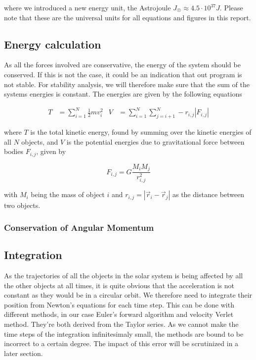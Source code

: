 \documentclass[10pt]{article}
\begin{document}
\begin{multicols}{2}
where we introduced a new energy unit, the Astrojoule $J_\Sun \approx 4.5\cdot10^{37}J  $.  Please note
that these are the universal units for all equations and figures in this
report.


\subsection{Energy calculation}
As all the forces involved are conservative, the energy of the system
should be conserved. If this is not the case, it could be an indication
that out program is not stable. For stability analysis, we will therefore
make sure that the sum of the systems energies is constant. The energies
are given by the following equations 

\begin{align}\label{eq:energies}
    T &= \sum_{i=1}^N \frac{1}{2}mv_i^2 & V &= \sum_{i=1}^N \sum_{j=i+1}^N
    -r_{i,j}|F_{i,j}|
\end{align}

where $T$ is the total kinetic energy, found by summing over the kinetic
energies of all $N$ objects, and $V$ is the potential energies due to
gravitational force between bodies $F_{i,j}$, given by

\begin{equation}
    F_{i,j} =  G\frac{M_iM_j}{r_{i,j}^2}
\end{equation}

with $M_i$ being the mass of object $i$ and $r_{i,j} = |\vec r_i - \vec
r_j|$ as the distance between two objects.

\subsubsection{Conservation of Angular Momentum}



\subsection{Integration}
As the trajectories of all the objects in the solar system is being
affected by all the other objects at all times, it is quite obvious that
the acceleration is not constant as they would be in a circular orbit. We
therefore need to integrate their position from Newton's equations for each
time step. This can be done with different methods, in our case Euler's
forward algorithm and velocity Verlet method. They're both derived from the
Taylor series. As we cannot make the time steps of the integration
infinitesimaly small, the methods are bound to be incorrect to a certain
degree. The impact of this error will be scrutinized in a later section.


\end{multicols}
\end{document}

